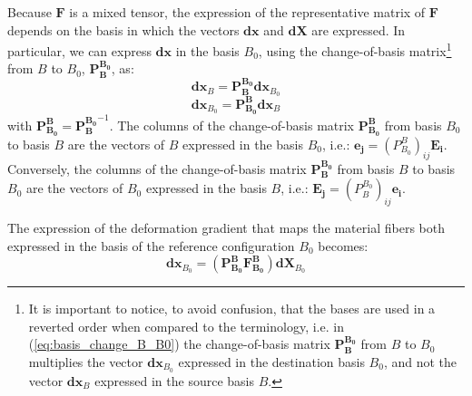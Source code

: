 \documentclass[letterpaper,12pt,oneside]{report}
\begin{document}
Because $\mathbf{F}$ is a mixed tensor, the expression of the representative matrix of $\mathbf{F}$ depends on the basis in which the vectors $\mathbf{dx}$ and $\mathbf{dX}$ are expressed. In particular, we can express $\mathbf{dx}$ in the basis $B_0$, using the change-of-basis matrix\footnote{It is important to notice, to avoid confusion, that the bases are used in a reverted order when compared to the terminology, i.e. in (\ref{eq:basis_change_B_B0}) the change-of-basis matrix $\mathbf{P_B^{B_0}}$ from $B$ to $B_0$ multiplies the vector $\mathbf{dx}_{B_0}$ expressed in the destination basis $B_0$, and not the vector $\mathbf{dx}_B$ expressed in the source basis $B$.} from $B$ to $B_0$, $\mathbf{P_B^{B_0}}$, as:
\begin{equation}
\mathbf{dx}_B = \mathbf{P_B^{B_0}} \mathbf{dx}_{B_0}
\label{eq:basis_change_B_B0}
\end{equation}
\begin{equation}
\mathbf{dx}_{B_0} = \mathbf{P_{B_0}^B} \mathbf{dx}_B
\label{eq:basis_change_B0_B}
\end{equation}
with $\mathbf{P_{B_0}^B} = \mathbf{P_B^{B_0}}^{-1}$. The columns of the change-of-basis matrix $\mathbf{P_{B_0}^B}$ from basis $B_0$ to basis $B$ are the vectors of $B$ expressed in the basis $B_0$, i.e.: $\mathbf{e_j} = \left(P_{B_0}^B\right)_{ij}\mathbf{E_i}$. Conversely, the columns of the change-of-basis matrix $\mathbf{P_B^{B_0}}$ from basis $B$ to basis $B_0$ are the vectors of $B_0$ expressed in the basis $B$, i.e.: $\mathbf{E_j} = \left(P_B^{B_0}\right)_{ij}\mathbf{e_i}$. %

The expression of the deformation gradient that maps the material fibers both expressed in the basis of the reference configuration $B_0$ becomes:
\begin{equation}
\mathbf{dx}_{B_0} = (\mathbf{P_{B_0}^B}\mathbf{F_{B_0}^B}) \mathbf{dX}_{B_0}
\label{eq:F_B_B0}
\end{equation}
\end{document}
